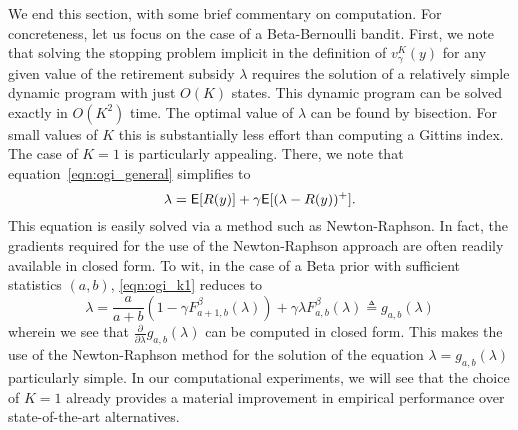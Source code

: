 We end this section, with some brief commentary on computation. For concreteness, let us focus on the case of a Beta-Bernoulli bandit. First, we note that solving the stopping problem implicit in the definition of $v^K_\gamma(y)$ for any given value of the retirement subsidy $\lambda$ requires the solution of a relatively simple dynamic program with just $O(K)$ states. This dynamic program can be solved exactly in $O(K^2)$ time. The optimal value of $\lambda$ can be found by bisection. For small values of $K$ this is substantially less effort than computing a Gittins index. The case of $K=1$ is particularly appealing. There, we note that equation~\eqref{eqn:ogi_general} simplifies to
\begin{equation} \label{eqn:ogi_k1}
\lambda = \mathsf{E}[R(y)] + \gamma \mathsf{E}[(\lambda - R(y))^+].
\end{equation}
This equation is easily solved via a method such as Newton-Raphson. In fact, the gradients required for the use of the Newton-Raphson approach are often readily available in closed form. To wit, in the case of a Beta prior with sufficient statistics $(a,b)$, \eqref{eqn:ogi_k1} reduces to
\[
	\lambda  =  \frac{a}{a+b}\left(1 - \gamma F^\beta_{a+1,b}(\lambda)\right) + \gamma \lambda F^\beta_{a,b}(\lambda) \triangleq g_{a,b}(\lambda)
\]
wherein we see that $\frac{\partial}{\partial \lambda} g_{a,b}(\lambda)$ can be computed in closed form. This makes the use of the Newton-Raphson method for the solution of the equation $\lambda =  g_{a,b}(\lambda)$ particularly simple. In our computational experiments, we will see that the choice of $K=1$ already provides a material improvement in empirical performance over state-of-the-art alternatives. 


